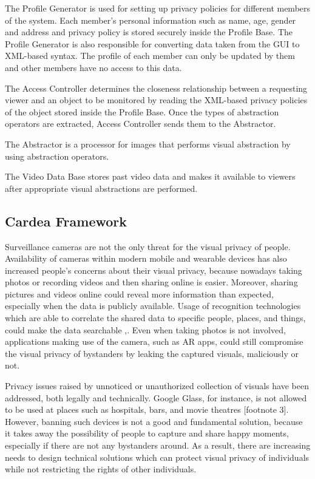 \documentclass[conference]{IEEEtran}
\begin{document}
The Profile Generator is used for setting up privacy policies for different members of the system. Each member's personal information such as name, age, gender and address and privacy policy is stored securely inside the Profile Base. The Profile Generator is also responsible for converting data taken from the GUI to \ac{XML}-based syntax. The profile of each member can only be updated by them and other members have no access to this data. 

The Access Controller determines the closeness relationship between a requesting viewer and an object to be monitored by reading the \ac{XML}-based privacy policies of the object stored inside the Profile Base. Once the types of abstraction operators are extracted, Access Controller sends them to the Abstractor. 

The Abstractor is a processor for images that performs visual abstraction by using abstraction operators. 

The Video Data Base stores past video data and makes it available to viewers after appropriate visual abstractions are performed. 

\subsection{Cardea Framework}

Surveillance cameras are not the only threat for the visual privacy of people. Availability of cameras within modern mobile and wearable devices has also increased people's concerns about their visual privacy, because nowadays taking photos or recording videos and then sharing online is easier. Moreover, sharing pictures and videos online could reveal more information than expected, especially when the data is publicly available. Usage of recognition technologies which are able to correlate the shared data to specific people, places, and things, could make the data searchable \cite{gross2014},\cite{shaw2006}. Even when taking photos is not involved, applications making use of the camera, such as \ac{AR} apps, could still compromise the visual privacy of bystanders by leaking the captured visuals, maliciously or not. 

Privacy issues raised by unnoticed or unauthorized collection of visuals have been addressed, both legally and technically. Google Glass, for instance, is not allowed to be used at places such as hospitals, bars, and movie theatres [footnote 3]. However, banning such devices is not a good and fundamental solution, because it takes away the possibility of people to capture and share happy moments, especially if there are not any bystanders around. As a result, there are increasing needs to design technical solutions which can protect visual privacy of individuals while not restricting the rights of other individuals. 
	
\end{document}
